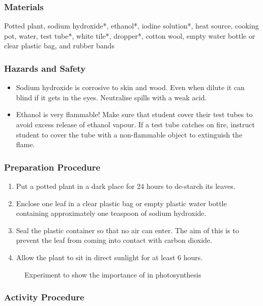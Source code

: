 \subsubsection*{Materials}
Potted plant, sodium hydroxide*, ethanol*, iodine solution*, heat source, cooking pot, water, test tube*, white tile*, dropper*, cotton wool, empty water bottle or clear plastic bag, and rubber bands

\subsubsection*{Hazards and Safety}
\begin{itemize}
\item{Sodium hydroxide is corrosive to skin and wood. Even when dilute it can blind if it gets in the eyes. Neutralise spills with a weak acid.}
\item{Ethanol is very flammable! Make sure that student cover their test tubes to avoid excess release of ethanol vapour. If a test tube catches on fire, instruct student to cover the tube with a non-flammable object to extinguish the flame.}
\end{itemize}

\subsubsection*{Preparation Procedure}
\begin{enumerate}
\item{Put a potted plant in a dark place for 24 hours to de-starch its leaves.}
\item{Enclose one leaf in a clear plastic bag or empty plastic water bottle containing approximately one teaspoon of sodium hydroxide.}
\item{Seal the plastic container so that no air can enter. The aim of this is to prevent the leaf from coming into contact with carbon dioxide.}
\item{Allow the plant to sit in direct sunlight for at least 6 hours.}
\end{enumerate}

\begin{figure}[h]
\begin{center}
\def\svgwidth{3cm}

\caption{Experiment to show the importance of  in photosynthesis}
\label{fig:CO2-photosynth}
\end{center}
\end{figure}
\subsubsection*{Activity Procedure}

